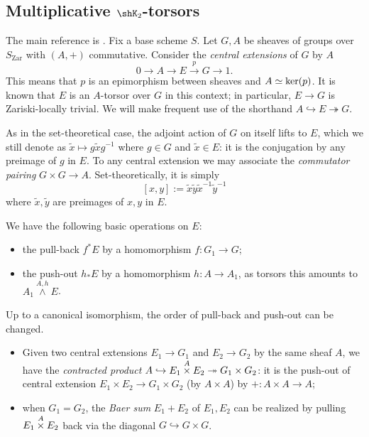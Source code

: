 \documentclass[12pt, a3paper, openany]{book}
\begin{document}
\subsection{Multiplicative \texorpdfstring{$\shK_2$-torsors}{K2-torsors}}
The main reference is \cite{BD01}. Fix a base scheme $S$. Let $G, A$ be sheaves of groups over $S_\text{Zar}$ with $(A,+)$ commutative. Consider the \emph{central extensions} of $G$ by $A$
\[ 0 \to A \to E \stackrel{p}{\to} G \to 1. \]
This means that $p$ is an epimorphism between sheaves and $A \simeq \operatorname{ker}(p)$. It is known \cite[Exp VII, 1.1.2]{SGA7-1} that $E$ is an $A$-torsor over $G$ in this context; in particular, $E \to G$ is Zariski-locally trivial. We will make frequent use of the shorthand $A \hookrightarrow E \twoheadrightarrow G$. %

As in the set-theoretical case, the adjoint action of $G$ on itself lifts to $E$, which we still denote as $\tilde{x} \mapsto g\tilde{x}g^{-1}$ where $g \in G$ and $\tilde{x} \in E$: it is the conjugation by any preimage of $g$ in $E$. To any central extension we may associate the \emph{commutator pairing} $G \times G \to A$. Set-theoretically, it is simply
\begin{equation}\label{eqn:commutator}
	[x,y] := \tilde{x}\tilde{y}\tilde{x}^{-1}\tilde{y}^{-1}
\end{equation} 
where $\tilde{x}, \tilde{y}$ are preimages of $x,y$ in $E$.

We have the following basic operations on $E$:
\begin{itemize}
	\item the pull-back $f^* E$ by a homomorphism $f: G_1 \to G$;
	\item the push-out $h_* E$ by a homomorphism $h: A \to A_1$, as torsors this amounts to $A_1 \overset{A,h}{\wedge} E$.
\end{itemize}
Up to a canonical isomorphism, the order of pull-back and push-out can be changed.
\begin{itemize}
	\item Given two central extensions $E_1 \to G_1$ and $E_2 \to G_2$ by the same sheaf $A$, we have the \emph{contracted product} $A \hookrightarrow E_1 \overset{A}{\times} E_2 \twoheadrightarrow G_1 \times G_2$: it is the push-out of central extension $E_1 \times E_2 \to G_1 \times G_2$ (by $A \times A$) by $+: A \times A \to A$;
	\item when $G_1 = G_2$, the \emph{Baer sum} $E_1 + E_2$ of $E_1, E_2$ can be realized by pulling $E_1 \overset{A}{\times} E_2$ back via the diagonal $G \hookrightarrow G \times G$.
\end{itemize}
 
\end{document}
